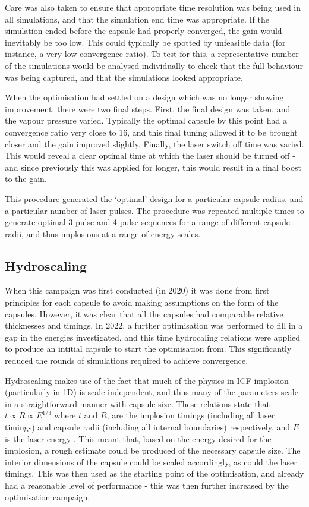 Care was also taken to ensure that appropriate time resolution was being used in all simulations, and that the simulation end time was appropriate. If the simulation ended before the capsule had properly converged, the gain would inevitably be too low. This could typically be spotted by unfeasible data (for instance, a very low convergence ratio). To test for this, a representative number of the simulations would be analysed individually to check that the full behaviour was being captured, and that the simulations looked appropriate.

When the optimisation had settled on a design which was no longer showing improvement, there were two final steps. First, the final design was taken, and the vapour pressure varied. Typically the optimal capsule by this point had a convergence ratio very close to 16, and this final tuning allowed it to be brought closer and the gain improved slightly. Finally, the laser switch off time was varied. This would reveal a clear optimal time at which the laser should be turned off - and since previously this was applied for longer, this would result in a final boost to the gain. 

This procedure generated the `optimal' design for a particular capsule radius, and a particular number of laser pulses. The procedure was repeated multiple times to generate optimal 3-pulse and 4-pulse sequences for a range of different capsule radii, and thus implosions at a range of energy scales.

\subsection{Hydroscaling}

When this campaign was first conducted (in 2020) it was done from first principles for each capsule to avoid making assumptions on the form of the capsules. However, it was clear that all the capsules had comparable relative thicknesses and timings. In 2022, a further optimisation was performed to fill in a gap in the energies investigated, and this time hydrocaling relations were applied to produce an intitial capsule to start the optimisation from. This significantly reduced the rounds of simulations required to achieve convergence.

Hydroscaling makes use of the fact that much of the physics in ICF implosion (particularly in 1D) is scale independent, and thus many of the parameters scale in a straightforward manner with capsule size. These relations state that $t \propto R \propto E^{1/3}$ where $t$ and $R$, are the implosion timings (including all laser timings) and capsule radii (including all internal boundaries) respectively, and $E$ is the laser energy \cite{Nora2014}. This meant that, based on the energy desired for the implosion, a rough estimate could be produced of the necessary capsule size. The interior dimensions of the capsule could be scaled accordingly, as could the laser timings. This was then used as the starting point of the optimisation, and already had a reasonable level of performance - this was then further increased by the optimisation campaign.

